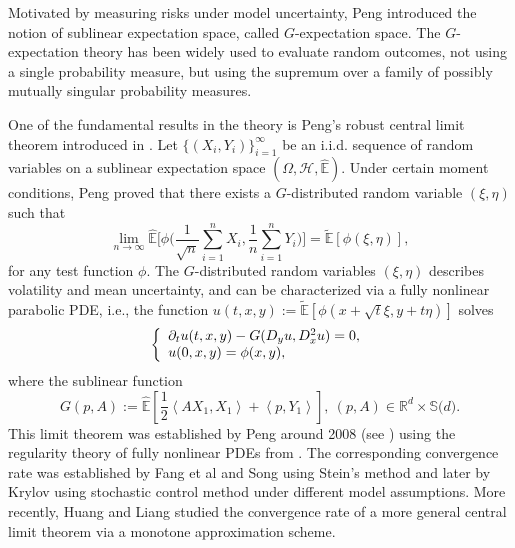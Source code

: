 \documentclass[a4paper,oneside,10pt]{article}%
\numberwithin{equation}{section}
\begin{document}
Motivated by measuring risks under model uncertainty, Peng
\cite{P2004,P2007,P20081,P2010} introduced the notion of sublinear expectation
space, called $G$-expectation space. The $G$-expectation theory has been
widely used to evaluate random outcomes, not using a single probability
measure, but using the supremum over a family of possibly mutually singular
probability measures.

One of the fundamental results in the theory is Peng's robust central limit
theorem introduced in \cite{P20082,P2019,P2010}. Let $\{(X_{i},Y_{i}%
)\}_{i=1}^{\infty}$ be an i.i.d. sequence of random variables on a sublinear
expectation space $(\Omega,\mathcal{H},\mathbb{\hat{E}})$. Under certain
moment conditions, Peng proved that there exists a $G$-distributed random
variable $(\xi,\eta)$ such that
\[
\lim_{n\rightarrow \infty}\mathbb{\hat{E}}\bigg[\phi \bigg(\frac{1}{\sqrt{n}%
}\sum_{i=1}^{n}{X_{i}},\frac{1}{n}\sum_{i=1}^{n}Y_{i}%
\bigg)\bigg]=\mathbb{\tilde{E}}[\phi(\xi,\eta)],
\]
for any test function $\phi$. The $G$-distributed random variables $(\xi
,\eta)$ describes volatility and mean uncertainty, and can be characterized
via a fully nonlinear parabolic PDE, i.e., the function
$u(t,x,y):=\mathbb{\tilde{E}}[\phi(x+\sqrt{t}\xi,y+t\eta)]$ solves
\begin{equation}
\left \{
\begin{array}
[c]{l}%
\partial_{t}u(t,x,y)-G(D_{y}u,D_{x}^{2}u)=0,\\
u(0,x,y)=\phi(x,y),
\end{array}
\right.  \label{0.1}%
\end{equation}
where the sublinear function
\[
G\left(  p,A\right)  :=\mathbb{\hat{E}}\left[  \frac{1}{2}\left \langle
AX_{1},X_{1}\right \rangle +\left \langle p,Y_{1}\right \rangle \right]
,\ (p,A)\in \mathbb{R}^{d}\times \mathbb{S(}d\mathbb{)}.
\]
This limit theorem was established by Peng around 2008 (see \cite{P20082})
using the regularity theory of fully nonlinear PDEs from
\cite{CC1995,Krylov1987, Wang1992}. The corresponding convergence rate was
established by Fang et al \cite{FPSS2019} and Song \cite{Song2020} using
Stein's method and later by Krylov \cite{Krylov2020} using stochastic control
method under different model assumptions. More recently, Huang and Liang
\cite{HL2020} studied the convergence rate of a more general central limit
theorem via a monotone approximation scheme.
\end{document}
